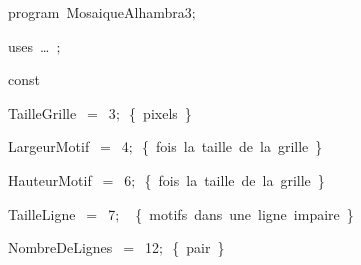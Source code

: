
{
\parindent {}
\medskip

\carrenoir
\vspace{\neglskip}\mbox{\blc  \idt  \mcl program\idt \ MosaiqueAlhambra3$;$
}\par 
\vspace{\neglskip}\mbox{\blc \blk\idt \mcl uses\idt \ \ldots\ $;$
}\par 
\medskip

\pagebreak[3] 
\vspace{\neglskip}\mbox{\blc  \blk\idt  \mcl const\idt }\par 
\vspace{\neglskip}\mbox{\blc  \blk\blk\idt  TailleGrille\ $=$\ 3$;$\ \cmt  \{\ pixels\ \}\idt }\par 
\vspace{\neglskip}\mbox{\blc  \blk\blk\idt  LargeurMotif\ $=$\ 4$;$\ \cmt  \{\ fois\ la\ taille\ de\ la\ grille\ \}\idt }\par 
\vspace{\neglskip}\mbox{\blc  \blk\blk\idt  HauteurMotif\ $=$\ 6$;$\ \cmt  \{\ fois\ la\ taille\ de\ la\ grille\ \}\idt }\par 
\vspace{\neglskip}\mbox{\blc  \blk\blk\idt  TailleLigne\ $=$\ 7$;$\ \ \cmt  \{\ motifs\ dans\ une\ ligne\ impaire\ \}\idt }\par 
\vspace{\neglskip}\mbox{\blc  \blk\blk\idt  NombreDeLignes\ $=$\ 12$;$\ \cmt  \{\ pair\ \}\idt }\par 
\medskip

}
